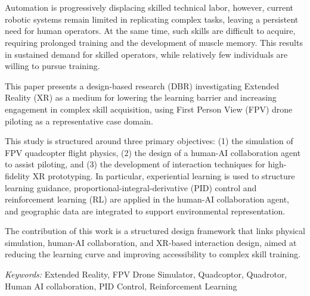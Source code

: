 
\newpage
\thispagestyle{empty} 
\setcounter{page}{2}
\section*{}
\noindent 
Automation is progressively displacing skilled technical labor, however, current robotic systems remain limited in replicating complex tasks, leaving a persistent need for human operators. At the same time, such skills are difficult to acquire, requiring prolonged training and the development of muscle memory. This results in sustained demand for skilled operators, while relatively few individuals are willing to pursue training.

\noindent
This paper presents a design-based research (DBR) investigating Extended Reality (XR) as a medium for lowering the learning barrier and increasing engagement in complex skill acquisition, using First Person View (FPV) drone piloting as a representative case domain.

\noindent
This study is structured around three primary objectives: (1) the simulation of FPV quadcopter flight physics, (2) the design of a human-AI collaboration agent to assist piloting, and (3) the development of interaction techniques for high-fidelity XR prototyping. In particular, experiential learning is used to structure learning guidance, proportional-integral-derivative (PID)  control and reinforcement learning (RL) are applied in the human-AI collaboration agent, and geographic data are integrated to support environmental representation.

\noindent
The contribution of this work is a structured design framework that links physical simulation, human-AI collaboration, and XR-based interaction design, aimed at reducing the learning curve and improving accessibility to complex skill training.

\vspace{0.5in} 
\textit{Keywords:} 
Extended Reality, 
FPV Drone Simulator, 
Quadcoptor,
Quadrotor,
Human AI collaboration,
PID Control,
Reinforcement Learning
